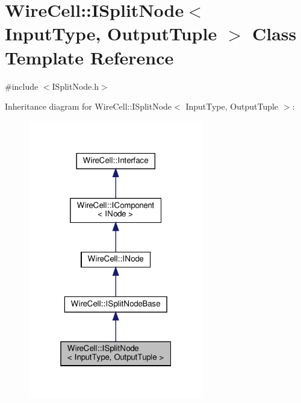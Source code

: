 \hypertarget{class_wire_cell_1_1_i_split_node}{}\section{Wire\+Cell\+:\+:I\+Split\+Node$<$ Input\+Type, Output\+Tuple $>$ Class Template Reference}
\label{class_wire_cell_1_1_i_split_node}


{\ttfamily \#include $<$I\+Split\+Node.\+h$>$}



Inheritance diagram for Wire\+Cell\+:\+:I\+Split\+Node$<$ Input\+Type, Output\+Tuple $>$\+:
\nopagebreak
\begin{figure}[H]
\begin{center}
\leavevmode
\includegraphics[width=217pt]{class_wire_cell_1_1_i_split_node__inherit__graph}
\end{center}
\end{figure}


